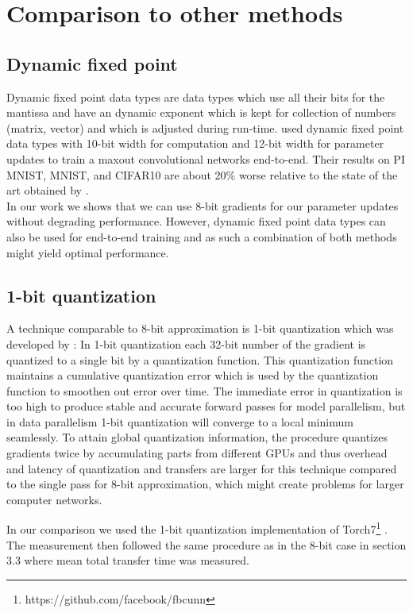 \documentclass{article} %
\begin{document}
\section{Comparison to other methods}

\subsection{Dynamic fixed point}

Dynamic fixed point data types are data types which use all their bits for the mantissa and have an dynamic exponent which is kept for collection of numbers (matrix, vector) and which is adjusted during run-time. \citet{courbariaux2014low} used dynamic fixed point data types with 10-bit width for computation and 12-bit width for parameter updates to train a maxout convolutional networks end-to-end. Their results on PI MNIST, MNIST, and CIFAR10 are about 20\% worse relative to the state of the art obtained by \citet{goodfellow2013maxout}.\\ 
In our work we shows that we can use 8-bit gradients for our parameter updates without degrading performance. However, dynamic fixed point data types can also be used for end-to-end training and as such a combination of both methods might yield optimal performance. 

\subsection{1-bit quantization}
A technique comparable to 8-bit approximation is 1-bit quantization which was developed by \citet{seide20141}: In 1-bit quantization each 32-bit number of the gradient is quantized to a single bit by a quantization function. This quantization function maintains a cumulative quantization error which is used by the quantization function to smoothen out error over time. The immediate error in quantization is too high to produce stable and accurate forward passes for model parallelism, but in data parallelism 1-bit quantization will converge to a local minimum seamlessly. To attain global quantization information, the procedure quantizes gradients twice by accumulating parts from different GPUs and thus overhead and latency of quantization and transfers are larger for this technique compared to the single pass for 8-bit approximation, which might create problems for larger computer networks.

In our comparison we used the 1-bit quantization implementation of Torch7\footnote{https://github.com/facebook/fbcunn} \citep{collobert2011torch7}. The measurement then followed the same procedure as in the 8-bit case in section 3.3 where mean total transfer time was measured.
\end{document}
